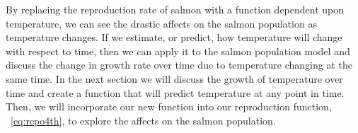 By replacing the reproduction rate of salmon with a function dependent upon temperature, we can see the drastic affects on the salmon population as temperature changes.
If we estimate, or predict, how temperature will change with respect to time, then we can apply it to the salmon population model and discuss the change in growth rate over time due to temperature changing at the same time.
In the next section we will discuss the growth of temperature over time and create a function that will predict temperature at any point in time.
Then, we will incorporate our new function into our reproduction function, \equationautorefname~\eqref{eq:repo4th}, to explore the affects on the salmon population.
